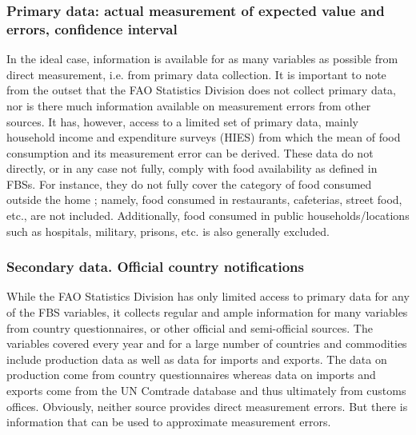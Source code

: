 \documentclass[nojss]{jss}
\begin{document}
\subsubsection{Primary data: actual measurement of expected value and errors, confidence interval}
In the ideal case, information is available for as many variables as possible from direct measurement, i.e. from primary data collection. It is important to note from the outset that the FAO Statistics Division does not collect primary data, nor is there much information available on measurement errors from other sources. It has, however, access to a limited set of primary data, mainly household income and expenditure surveys (HIES) from which the mean of food consumption and its measurement error can be derived. These data do not directly, or in any case not fully, comply with food availability as defined in FBSs. For instance, they do not fully cover the category of food consumed outside the home ; namely, food consumed in restaurants, cafeterias, street food, etc., are not included.  Additionally, food consumed in public households/locations such as hospitals, military, prisons, etc. is also generally excluded.

\subsubsection{Secondary data. Official country notifications}
While the FAO Statistics Division has only limited access to primary data for any of the FBS variables, it collects regular and ample information for many variables from country questionnaires, or other official and semi-official sources. The variables covered every year and for a large number of countries and commodities include production data as well as data for imports and exports. The data on production come from country questionnaires whereas data on imports and exports come from the UN Comtrade database  and thus ultimately from customs offices. Obviously, neither source provides direct measurement errors. But there is information that can be used to approximate measurement errors. 
\end{document}
